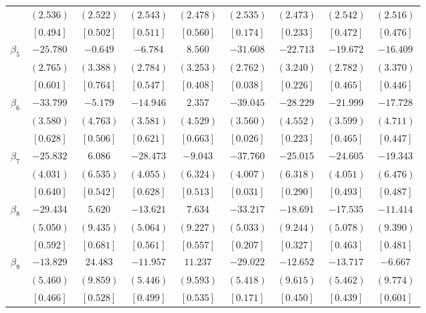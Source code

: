 \documentclass[12pt]{article}
\begin{document}
\begin{table}[h!]
\begin{adjustbox}{width=\textwidth}
\begin{tabular}{lcccccccc}
& $(  2.536)$ & $(  2.522)$ & $(  2.543)$ & $(  2.478)$ & $(  2.535)$ & $(  2.473)$ & $(  2.542)$ & $(  2.516)$ \\
& $[  0.494]$ & $[  0.502]$ & $[  0.511]$ & $[  0.560]$ & $[  0.174]$ & $[  0.233]$ & $[  0.472]$ & $[  0.476]$ \\
 $\beta_{5}$  & $-25.780$ & $ -0.649$ & $ -6.784$ & $  8.560$ & $-31.608$ & $-22.713$ & $-19.672$ & $-16.409$ \\
& $(  2.765)$ & $(  3.388)$ & $(  2.784)$ & $(  3.253)$ & $(  2.762)$ & $(  3.240)$ & $(  2.782)$ & $(  3.370)$ \\
& $[  0.601]$ & $[  0.764]$ & $[  0.547]$ & $[  0.408]$ & $[  0.038]$ & $[  0.226]$ & $[  0.465]$ & $[  0.446]$ \\
 $\beta_{6}$  & $-33.799$ & $ -5.179$ & $-14.946$ & $  2.357$ & $-39.045$ & $-28.229$ & $-21.999$ & $-17.728$ \\
& $(  3.580)$ & $(  4.763)$ & $(  3.581)$ & $(  4.529)$ & $(  3.560)$ & $(  4.552)$ & $(  3.599)$ & $(  4.711)$ \\
& $[  0.628]$ & $[  0.506]$ & $[  0.621]$ & $[  0.663]$ & $[  0.026]$ & $[  0.223]$ & $[  0.465]$ & $[  0.447]$ \\
 $\beta_{7}$  & $-25.832$ & $  6.086$ & $-28.473$ & $ -9.043$ & $-37.760$ & $-25.015$ & $-24.605$ & $-19.343$ \\
& $(  4.031)$ & $(  6.535)$ & $(  4.055)$ & $(  6.324)$ & $(  4.007)$ & $(  6.318)$ & $(  4.051)$ & $(  6.476)$ \\
& $[  0.640]$ & $[  0.542]$ & $[  0.628]$ & $[  0.513]$ & $[  0.031]$ & $[  0.290]$ & $[  0.493]$ & $[  0.487]$ \\
 $\beta_{8}$  & $-29.434$ & $  5.620$ & $-13.621$ & $  7.634$ & $-33.217$ & $-18.691$ & $-17.535$ & $-11.414$ \\
& $(  5.050)$ & $(  9.435)$ & $(  5.064)$ & $(  9.227)$ & $(  5.033)$ & $(  9.244)$ & $(  5.078)$ & $(  9.390)$ \\
& $[  0.592]$ & $[  0.681]$ & $[  0.561]$ & $[  0.557]$ & $[  0.207]$ & $[  0.327]$ & $[  0.463]$ & $[  0.481]$ \\
 $\beta_{9}$  & $-13.829$ & $ 24.483$ & $-11.957$ & $ 11.237$ & $-29.022$ & $-12.652$ & $-13.717$ & $ -6.667$ \\
& $(  5.460)$ & $(  9.859)$ & $(  5.446)$ & $(  9.593)$ & $(  5.418)$ & $(  9.615)$ & $(  5.462)$ & $(  9.774)$ \\
& $[  0.466]$ & $[  0.528]$ & $[  0.499]$ & $[  0.535]$ & $[  0.171]$ & $[  0.450]$ & $[  0.439]$ & $[  0.601]$ \\

\end{tabular}
\end{adjustbox}
\end{table}
\end{document}
